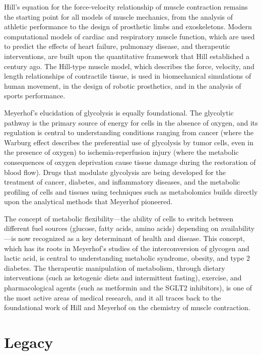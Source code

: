 Hill's equation for the force-velocity relationship of muscle contraction remains the starting point for all models of muscle mechanics, from the analysis of athletic performance to the design of prosthetic limbs and exoskeletons. Modern computational models of cardiac and respiratory muscle function, which are used to predict the effects of heart failure, pulmonary disease, and therapeutic interventions, are built upon the quantitative framework that Hill established a century ago. The Hill-type muscle model, which describes the force, velocity, and length relationships of contractile tissue, is used in biomechanical simulations of human movement, in the design of robotic prosthetics, and in the analysis of sports performance.

Meyerhof's elucidation of glycolysis is equally foundational. The glycolytic pathway is the primary source of energy for cells in the absence of oxygen, and its regulation is central to understanding conditions ranging from cancer (where the Warburg effect describes the preferential use of glycolysis by tumor cells, even in the presence of oxygen) to ischemia-reperfusion injury (where the metabolic consequences of oxygen deprivation cause tissue damage during the restoration of blood flow). Drugs that modulate glycolysis are being developed for the treatment of cancer, diabetes, and inflammatory diseases, and the metabolic profiling of cells and tissues using techniques such as metabolomics builds directly upon the analytical methods that Meyerhof pioneered.

The concept of metabolic flexibility---the ability of cells to switch between different fuel sources (glucose, fatty acids, amino acids) depending on availability---is now recognized as a key determinant of health and disease. This concept, which has its roots in Meyerhof's studies of the interconversion of glycogen and lactic acid, is central to understanding metabolic syndrome, obesity, and type 2 diabetes. The therapeutic manipulation of metabolism, through dietary interventions (such as ketogenic diets and intermittent fasting), exercise, and pharmacological agents (such as metformin and the SGLT2 inhibitors), is one of the most active areas of medical research, and it all traces back to the foundational work of Hill and Meyerhof on the chemistry of muscle contraction.

\section{Legacy}

